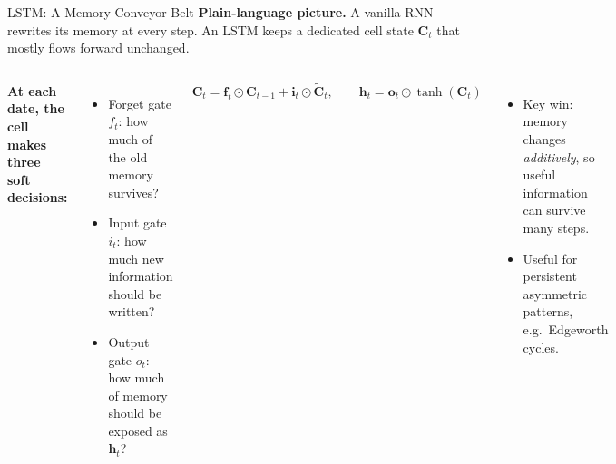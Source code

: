 \documentclass[aspectratio=169,11pt]{beamer}
\newcommand{\emphc}[1]{\textcolor{harvardcrimson}{#1}}
\begin{document}
\begin{frame}[shrink=8]{LSTM: A Memory Conveyor Belt}
\footnotesize
\textbf{Plain-language picture.} A vanilla RNN rewrites its memory at every step.  An LSTM keeps a dedicated \emphc{cell state} $\bm{C}_t$ that mostly flows forward unchanged.

\vspace{2pt}
\begin{columns}[T]
\textbf{At each date, the cell makes three soft decisions:}
\begin{itemize}\itemsep1pt
    \item \emphc{Forget gate} $f_t$: how much of the old memory survives?
    \item \emphc{Input gate} $i_t$: how much new information should be written?
    \item \emphc{Output gate} $o_t$: how much of memory should be exposed as $\bm{h}_t$?
\end{itemize}

\vspace{2pt}
\[
\bm{C}_t = \bm{f}_t \odot \bm{C}_{t-1} + \bm{i}_t \odot \tilde{\bm{C}}_t,
\qquad
\bm{h}_t = \bm{o}_t \odot \tanh(\bm{C}_t)
\]

\vspace{1pt}
\begin{itemize}\itemsep1pt
    \item \emphc{Key win:} memory changes \emph{additively}, so useful information can survive many steps.
    \item Useful for persistent asymmetric patterns, e.g.\ Edgeworth cycles.
\end{itemize}


\end{columns}
\end{frame}
\end{document}
